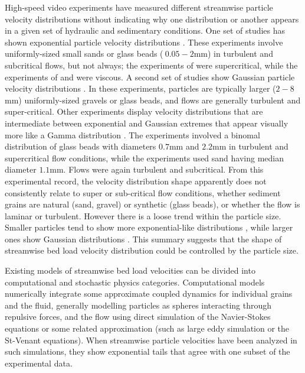 High-speed video experiments have measured different streamwise particle velocity distributions without indicating why one distribution or another appears in a given set of hydraulic and sedimentary conditions.
One set of studies has shown exponential particle velocity distributions \citep{Charru2004,Lajeunesse2010,Roseberry2012,Seizilles2014,Fathel2015,Fathel2016}.
These experiments involve uniformly-sized small sands or glass beads ($~0.05-2$mm) in turbulent and subcritical flows, but not always; the experiments of \citet{Lajeunesse2010} were supercritical, while the experiments of \citet{Charru2004} and \citet{Seizilles2014} were viscous.
A second set of studies show Gaussian particle velocity distributions \citep{Ancey2014,Heyman2016,Martin2012}. In these experiments, particles are typically larger ($2-8$mm) uniformly-sized gravels or glass beads, and flows are generally turbulent and super-critical.
Other experiments display velocity distributions that are intermediate between exponential and Gaussian extremes that appear visually more like a Gamma distribution \citep{Houssais2012, Liu2019}.
The \citet{Houssais2012} experiments involved a binomal distribution of glass beads with diameters $0.7$mm and $2.2$mm in turbulent and supercritical flow conditions, while the \citet{Liu2019} experiments used sand having median diameter $1.1$mm. Flows were again turbulent and subcritical.
From this experimental record, the velocity distribution shape apparently does not consistently relate to super or sub-critical flow conditions, whether sediment grains are natural (sand, gravel) or synthetic (glass beads), or whether the flow is laminar or turbulent.
However there is a loose trend within the particle size. Smaller particles tend to show more exponential-like distributions \citep[e.g.][]{Fathel2015}, while larger ones show Gaussian distributions \citep[e.g.][]{Heyman2016}. This summary suggests that the shape of streamwise bed load velocity distribution could be controlled by the particle size.

Existing models of streamwise bed load velocities can be divided into computational and stochastic physics categories.
Computational models numerically integrate some approximate coupled dynamics for individual grains and the fluid, generally modelling particles as spheres interacting through repulsive forces, and the flow using direct simulation of the Navier-Stokes equations or some related approximation (such as large eddy simulation or the St-Venant equations).
When streamwise particle velocities have been analyzed in such simulations, they show exponential tails \citep{Gonzalez2017,Furbish2013} that agree with one subset of the experimental data.

